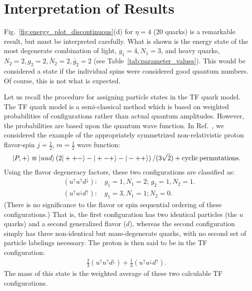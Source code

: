 \documentclass[fleqn]{article}
\begin{document}
\section{Interpretation of Results}

Fig.~\ref{fig:energy_plot_discontinuous}(d) for $\eta=4$ (20 quarks) is a remarkable result, but must be interpreted carefully. What is shown is the energy state of the most degenerate combination of light, $g_1=4, N_1=3$, and heavy quarks, $N_2=2,g_2=2,\bar{N}_2=2,\bar{g}_2=2$ (see Table~\ref{tab:parameter_values}). This would be considered a state if the individual spins were considered good quantum numbers. Of course, this is not what is expected.

Let us recall the procedure for assigning particle states in the TF quark model. The TF quark model is a semi-classical method which is based on weighted probabilities of configurations rather than actual quantum amplitudes. However, the probabilities are based upon the quantum wave function. In Ref.~\cite{Liu:2012my}, we considered the example of the appropriately symmetrized non-relativistic proton flavor-spin $j=\frac{1}{2}$, $m=\frac{1}{2}$ wave function:
\begin{eqnarray}
|P,+\rangle\equiv |uud\rangle \left(2|++-\rangle-|+-+\rangle-|-++\rangle\right)/(3\sqrt{2})+ {\rm cyclic\, permutations}.\label{proton}
\end{eqnarray}
Using the flavor degeneracy factors, these two configurations are classified as:
\begin{eqnarray*}
& (u^{\uparrow}u^{\uparrow}d^{\downarrow}):& \, g_1=1, N_1=2;\, g_2=1, N_2=1.\\ 
& (u^{\uparrow}u^{\downarrow}d^{\uparrow}):& \, g_1=3, N_1=1; N_2=0.  \label{pconfig3}
\end{eqnarray*}
(There is no significance to the flavor or spin sequential ordering of these configurations.) That is, the first configuration has two identical particles (the $u$ quarks) and a second generalized flavor ($d$), whereas the second configuration simply has three non-identical but mass-degenerate quarks, with no second set of particle labelings necessary. The proton is then said to be in the TF configuration:
\begin{eqnarray*}
\frac{2}{3}(u^{\uparrow}u^{\uparrow}d^{\downarrow})+\frac{1}{3}(u^{\uparrow}u^{\downarrow}d^{\uparrow}).   \label{pconfig2}
\end{eqnarray*}
The mass of this state is the weighted average of these two calculable TF configurations.
\end{document}
